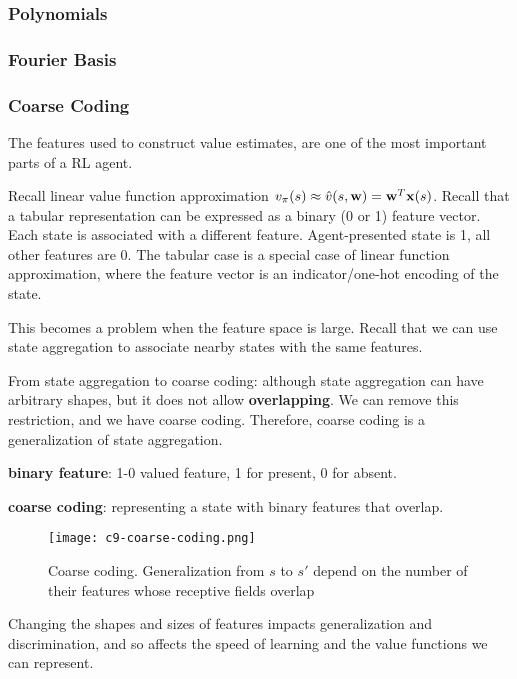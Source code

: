 \documentclass[sutton_barto_notes.tex]{subfiles}
\begin{document}
\subsubsection{Polynomials}
\subsubsection{Fourier Basis}
\subsubsection{Coarse Coding}

The features used to construct value estimates, are one of the most important parts of a RL agent.

Recall linear value function approximation $v_\pi(s) \approx \hat{v}(s,{\operatorname*{\mathbf{w}}}) = {\operatorname*{\mathbf{w}}}^T{\operatorname*{\mathbf{x}}}(s)$. Recall that a tabular representation can be expressed as a binary (0 or 1) feature vector. Each state is associated with a different feature. Agent-presented state is 1, all other features are 0. The tabular case is a special case of linear function approximation, where the feature vector is an indicator/one-hot encoding of the state.

This becomes a problem when the feature space is large. Recall that we can use state aggregation to associate nearby states with the same features.

From state aggregation to coarse coding: although state aggregation can have arbitrary shapes, but it does not allow \textbf{overlapping}. We can remove this restriction, and we have coarse coding. Therefore, coarse coding is a generalization of state aggregation.

\begin{definition}
\textbf{binary feature}: 1-0 valued feature, 1 for present, 0 for absent.
\end{definition}
\begin{definition}
\textbf{coarse coding}: representing a state with binary features that overlap.
\end{definition}

\begin{figure}[h!]
  \centering
  \texttt{[image: c9-coarse-coding.png]}
  \caption{Coarse coding. Generalization from $s$ to $s'$ depend on the number of their features whose receptive fields overlap}
  \label{fig:coarse-coding}
\end{figure}

Changing the shapes and sizes of features impacts generalization and discrimination, and so affects the speed of learning and the value functions we can represent.
\end{document}
